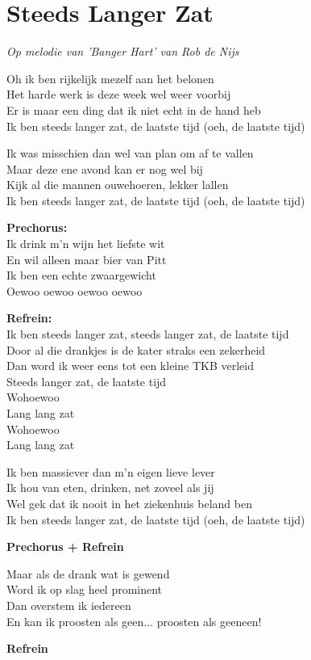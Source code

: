 \section{Steeds Langer Zat}
\textit{Op melodie van 'Banger Hart' van Rob de Nijs}

Oh ik ben rijkelijk mezelf aan het belonen\\
Het harde werk is deze week wel weer voorbij\\
Er is maar een ding dat ik niet echt in de hand heb\\
Ik ben steeds langer zat, de laatste tijd (oeh, de laatste tijd)

Ik was misschien dan wel van plan om af te vallen\\
Maar deze ene avond kan er nog wel bij\\
Kijk al die mannen ouwehoeren, lekker lallen\\
Ik ben steeds langer zat, de laatste tijd (oeh, de laatste tijd)

\textbf{Prechorus:}\\
Ik drink m'n wijn het liefste wit\\
En wil alleen maar bier van Pitt\\
Ik ben een echte zwaargewicht\\
Oewoo oewoo oewoo oewoo

\textbf{Refrein:}\\
Ik ben steeds langer zat, steeds langer zat, de laatste tijd\\
Door al die drankjes is de kater straks een zekerheid\\
Dan word ik weer eens tot een kleine TKB verleid\\
Steeds langer zat, de laatste tijd\\
Wohoewoo\\
Lang lang zat\\
Wohoewoo\\
Lang lang zat

Ik ben massiever dan m'n eigen lieve lever\\
Ik hou van eten, drinken, net zoveel als jij\\
Wel gek dat ik nooit in het ziekenhuis beland ben\\
Ik ben steeds langer zat, de laatste tijd (oeh, de laatste tijd)

\textbf{Prechorus + Refrein}

Maar als de drank wat is gewend\\
Word ik op slag heel prominent\\
Dan overstem ik iedereen\\
En kan ik proosten als geen... proosten als geeneen!

\textbf{Refrein}